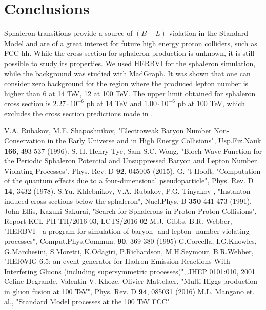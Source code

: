 \documentclass[a4paper,12pt]{article}         %
\begin{document}
\section{Conclusions}
Sphaleron transitions provide a source of $(B+L)$-violation in the Standard Model and are of a great interest for future high energy proton colliders, such as FCC-hh. While the cross-section for sphaleron production is unknown, it is still possible to study its properties. We used HERBVI for the sphaleron simulation, while the background was studied with MadGraph. It was shown that one can consider zero background for the region where the produced lepton number is higher than 6 at 14 TeV, 12 at 100 TeV. The upper limit obtained for sphaleron cross section is $2.27 \cdot 10^{-6}$ pb at 14 TeV and $1.00 \cdot 10^{-6}$ pb at 100 TeV, which excludes the cross section predictions made in \cite{ellis}.


\begin{thebibliography}{9}

 V.A. Rubakov, M.E. Shaposhnikov, "Electroweak Baryon Number Non-Conservation in the Early Universe and in High Energy Collisions", Usp.Fiz.Nauk \textbf{166}, 493-537 (1996).
 S.-H. Henry Tye, Sam S.C. Wong, "Bloch Wave Function for the Periodic Sphaleron Potential and Unsuppressed Baryon and Lepton Number Violating Processes", Phys. Rev. D \textbf{92}, 045005 (2015).
 G. 't Hooft, "Computation of the quantum effects due to a four-dimensional pseudoparticle", Phys. Rev. D \textbf{14}, 3432 (1978).
 S.Yu. Khlebnikov, V.A. Rubakov, P.G. Tinyakov , "Instanton induced cross-sections below the sphaleron", Nucl.Phys. B \textbf{350} 441-473 (1991).
 John Ellis, Kazuki Sakurai, "Search for Sphalerons in Proton-Proton Collisions", Report KCL-PH-TH/2016-03, LCTS/2016-02
 M.J. Gibbs, B.R. Webber, "HERBVI - a program for simulation of baryon- and lepton- number violating processes", Comput.Phys.Commun. \textbf{90}, 369-380 (1995)
 G.Corcella, I.G.Knowles, G.Marchesini, S.Moretti, K.Odagiri, P.Richardson, M.H.Seymour, B.R.Webber, "HERWIG 6.5: an event generator for Hadron Emission Reactions With Interfering Gluons (including supersymmetric processes)", JHEP 0101:010, 2001
 Celine Degrande, Valentin V. Khoze, Olivier Mattelaer, "Multi-Higgs production in gluon fusion at 100 TeV", Phys. Rev. D \textbf{94}, 085031 (2016)
 M.L. Mangano et. al., "Standard Model processes at the 100 TeV FCC"

\end{thebibliography}
\end{document}
